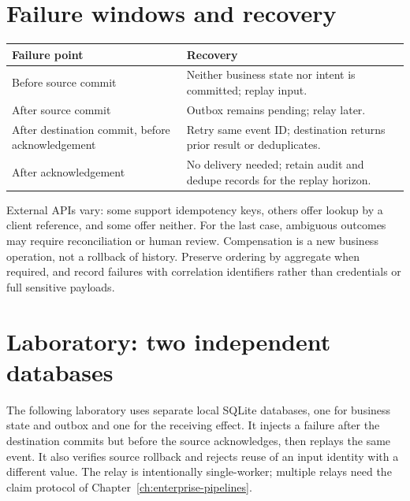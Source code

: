 \section{Failure windows and recovery}
\begin{longtable}{L{.34\linewidth}L{.58\linewidth}}
\toprule Failure point & Recovery \\ \midrule\endhead
Before source commit & Neither business state nor intent is committed; replay input. \\
After source commit & Outbox remains pending; relay later. \\
After destination commit, before acknowledgement & Retry same event ID; destination returns prior result or deduplicates. \\
After acknowledgement & No delivery needed; retain audit and dedupe records for the replay horizon. \\
\bottomrule
\end{longtable}
External APIs vary: some support idempotency keys, others offer lookup by a
client reference, and some offer neither. For the last case, ambiguous
outcomes may require reconciliation or human review. Compensation is a new
business operation, not a rollback of history. Preserve ordering by
aggregate when required, and record failures with correlation identifiers
rather than credentials or full sensitive payloads.

\section{Laboratory: two independent databases}
The following laboratory uses separate local SQLite databases, one for
business state and outbox and one for the receiving effect. It injects a
failure after the destination commits but before the source acknowledges,
then replays the same event. It also verifies source rollback and rejects
reuse of an input identity with a different value. The relay is intentionally
single-worker; multiple relays need the claim protocol of
Chapter~\ref{ch:enterprise-pipelines}.

